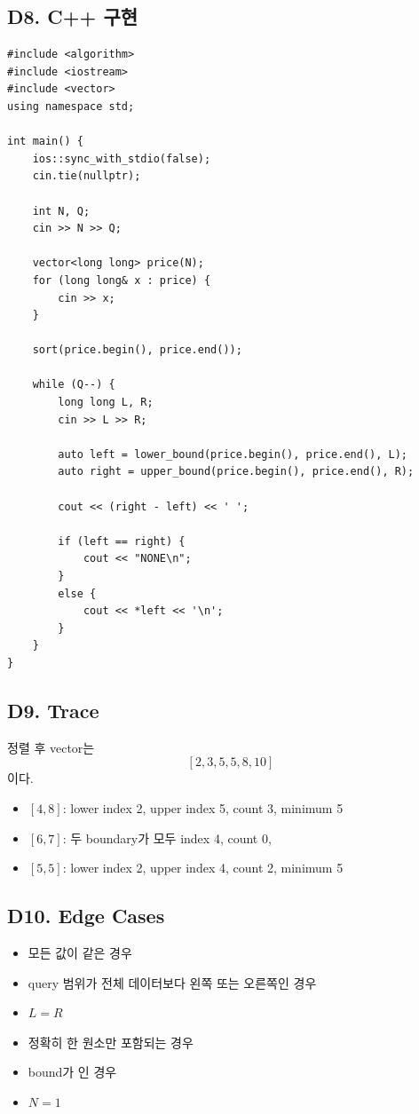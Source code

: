 \subsection{D8. C++ 구현}
\begin{lstlisting}
#include <algorithm>
#include <iostream>
#include <vector>
using namespace std;

int main() {
    ios::sync_with_stdio(false);
    cin.tie(nullptr);

    int N, Q;
    cin >> N >> Q;

    vector<long long> price(N);
    for (long long& x : price) {
        cin >> x;
    }

    sort(price.begin(), price.end());

    while (Q--) {
        long long L, R;
        cin >> L >> R;

        auto left = lower_bound(price.begin(), price.end(), L);
        auto right = upper_bound(price.begin(), price.end(), R);

        cout << (right - left) << ' ';

        if (left == right) {
            cout << "NONE\n";
        }
        else {
            cout << *left << '\n';
        }
    }
}
\end{lstlisting}

\subsection{D9. Trace}
정렬 후 vector는
\[
[2,3,5,5,8,10]
\]
이다.

\begin{itemize}
\item $[4,8]$: lower index 2, upper index 5, count 3, minimum 5
\item $[6,7]$: 두 boundary가 모두 index 4, count 0, 
\item $[5,5]$: lower index 2, upper index 4, count 2, minimum 5
\end{itemize}

\subsection{D10. Edge Cases}
\begin{itemize}
\item 모든 값이 같은 경우
\item query 범위가 전체 데이터보다 왼쪽 또는 오른쪽인 경우
\item $L=R$
\item 정확히 한 원소만 포함되는 경우
\item bound가 인 경우
\item $N=1$
\end{itemize}

